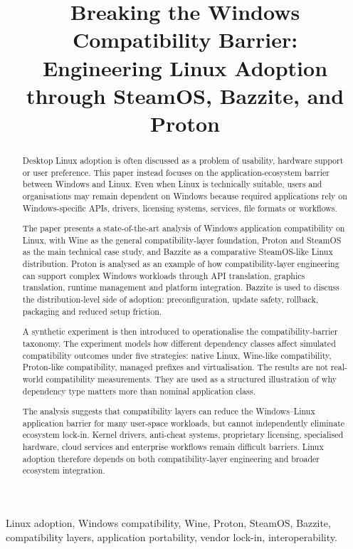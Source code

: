 \documentclass[conference]{IEEEtran}
\title{Breaking the Windows Compatibility Barrier:\\
Engineering Linux Adoption through SteamOS, Bazzite, and Proton}
\author{
\IEEEauthorblockN{Edoardo Ruggeri}
\IEEEauthorblockA{
RT2 Assignment 2\\
University of Genoa\\
}
}
\begin{document}
\maketitle

\begin{abstract}
Desktop Linux adoption is often discussed as a problem of usability, hardware support or user preference. This paper instead focuses on the application-ecosystem barrier between Windows and Linux. Even when Linux is technically suitable, users and organisations may remain dependent on Windows because required applications rely on Windows-specific APIs, drivers, licensing systems, services, file formats or workflows.

The paper presents a state-of-the-art analysis of Windows application compatibility on Linux, with Wine as the general compatibility-layer foundation, Proton and SteamOS as the main technical case study, and Bazzite as a comparative SteamOS-like Linux distribution. Proton is analysed as an example of how compatibility-layer engineering can support complex Windows workloads through API translation, graphics translation, runtime management and platform integration. Bazzite is used to discuss the distribution-level side of adoption: preconfiguration, update safety, rollback, packaging and reduced setup friction.

A synthetic experiment is then introduced to operationalise the compatibility-barrier taxonomy. The experiment models how different dependency classes affect simulated compatibility outcomes under five strategies: native Linux, Wine-like compatibility, Proton-like compatibility, managed prefixes and virtualisation. The results are not real-world compatibility measurements. They are used as a structured illustration of why dependency type matters more than nominal application class.

The analysis suggests that compatibility layers can reduce the Windows--Linux application barrier for many user-space workloads, but cannot independently eliminate ecosystem lock-in. Kernel drivers, anti-cheat systems, proprietary licensing, specialised hardware, cloud services and enterprise workflows remain difficult barriers. Linux adoption therefore depends on both compatibility-layer engineering and broader ecosystem integration.
\end{abstract}

\begin{IEEEkeywords}
Linux adoption, Windows compatibility, Wine, Proton, SteamOS, Bazzite, compatibility layers, application portability, vendor lock-in, interoperability.
\end{IEEEkeywords}
\end{document}
